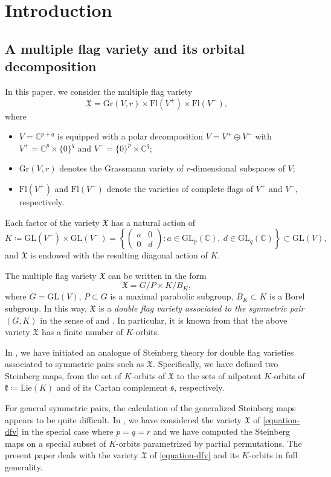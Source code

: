 \documentclass[11pt]{article}
\theoremstyle{definition}
\numberwithin{equation}{section}
\newcommand{\fk}{\mathfrak{k}}
\newcommand{\Xfv}{\mathfrak{X}}
\newcommand{\Grass}{\mathrm{Gr}}
\newcommand{\Flags}{\mathrm{Fl}}
\newcommand{\Lie}{\mathrm{Lie}}
\newcommand{\GL}{\mathrm{GL}}
\newcommand{\mC}{\mathbb{C}}
\begin{document}
\section{Introduction}

\subsection{A multiple flag variety and its orbital decomposition}
\label{section-1.1}
In this paper, we consider the multiple flag variety
\begin{equation}
\label{equation-dfv}
\Xfv=\Grass(V,r)\times \Flags(V^+)\times \Flags(V^-),
\end{equation}
where
\begin{itemize}
\item $V=\mC^{p+q}$ is equipped with a polar decomposition $V=V^+\oplus V^-$ with $V^+=\mC^p\times\{0\}^q$ and $V^-=\{0\}^p\times \mC^q$;
\item $\Grass(V,r)$ denotes the Grassmann variety of $r$-dimensional subspaces of $V$;
\item $\Flags(V^+)$ and $\Flags(V^-)$ denote the varieties of complete flags of $V^+$ and $V^-$, respectively.
\end{itemize}
Each factor of the variety $\Xfv$ has a natural action of
\[
K\coloneqq \GL(V^+)\times \GL(V^-)=\left\{\begin{pmatrix} a & 0\\ 0 & d \end{pmatrix}:a\in\GL_p(\mC),\ d\in\GL_q(\mC)\right\}\subset\GL(V),
\]
and $\Xfv$ is endowed with the resulting diagonal action of $K$.

The multiple flag variety $\Xfv$ can be written in the form
\[
\Xfv=G/P\times K/B_K,
\]
where $G=\GL(V)$, $P\subset G$ is a maximal parabolic subgroup, $B_K\subset K$ is a Borel subgroup.
In this way, $\Xfv$ is a \textit{double flag variety associated to the symmetric pair}
$(G,K)$
in the sense of \cite{NO} and \cite{HNOO}.
In particular, it is known from \cite{NO} that the above variety $\Xfv$ has a finite number of $K$-orbits.

In \cite{FN1,FN2}, we have initiated an analogue of Steinberg theory for double flag varieties associated to symmetric pairs such as $\Xfv$.
Specifically, we have defined two Steinberg maps, from the set of $K$-orbits of $\Xfv$ to the sets of nilpotent $K$-orbits of $\fk\coloneqq \Lie(K)$ and of its Cartan complement $\mathfrak{s}$, respectively.

For general symmetric pairs, the calculation of the generalized Steinberg maps appears to be quite difficult.
In \cite{FN2}, we have considered the variety $\Xfv$ of \eqref{equation-dfv} in the special case where $p=q=r$ and we have computed the Steinberg maps on a special subset of $K$-orbits parametrized by partial permutations.
The present paper deals with the variety $\Xfv$ of \eqref{equation-dfv} and its $K$-orbits in full generality.
\end{document}
